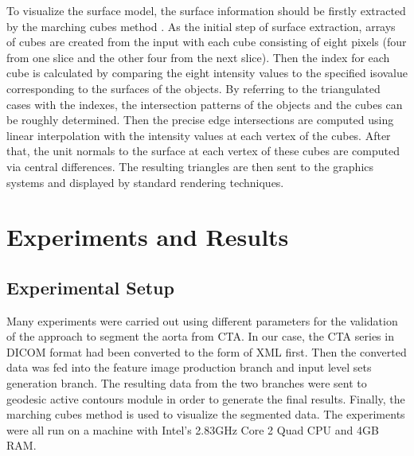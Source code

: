 To visualize the surface model, the surface information should be firstly extracted by the marching cubes method \cite{Lorensen1987MC}.
As the initial step of surface extraction, arrays of cubes are created from the input with each cube consisting of eight pixels (four from one slice and the other four from the next slice).
Then the index for each cube is calculated by comparing the eight intensity values to the specified isovalue corresponding to the surfaces of the objects.
By referring to the triangulated cases with the indexes, the intersection patterns of the objects and the cubes can be roughly determined.
Then the precise edge intersections are computed using linear interpolation with the intensity values at each vertex of the cubes.
After that, the unit normals to the surface at each vertex of these cubes are computed via central differences.
The resulting triangles are then sent to the graphics systems and displayed by standard rendering techniques.

\section{Experiments and Results}

\subsection{Experimental Setup}
Many experiments were carried out using different parameters for the validation of the approach to segment the aorta from CTA.
In our case, the CTA series in DICOM format had been converted to the form of XML first.
Then the converted data was fed into the feature image production branch and input level sets generation branch.
The resulting data from the two branches were sent to geodesic active contours module in order to generate the final results.
Finally, the marching cubes method is used to visualize the segmented data.
The experiments were all run on a machine with Intel's 2.83GHz Core 2 Quad CPU and 4GB RAM.

